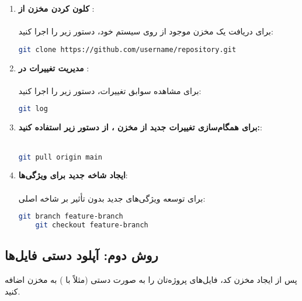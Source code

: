 \begin{enumerate}
    \item \textbf{کلون کردن مخزن از }:\\\\
    برای دریافت یک مخزن موجود از  روی سیستم خود، دستور زیر را اجرا کنید:
    \begin{terminal}
    \begin{lstlisting}[language=bash]
    git clone https://github.com/username/repository.git
    \end{lstlisting}
    \end{terminal} 

     \item \textbf{مدیریت تغییرات در }:\\\\
     برای مشاهده سوابق تغییرات، دستور زیر را اجرا کنید:
     \begin{terminal}
    \begin{lstlisting}[language=bash]
    git log
    \end{lstlisting}
    \end{terminal} 

    \item \textbf{برای همگام‌سازی تغییرات جدید از مخزن ، از دستور زیر استفاده کنید:}:\\\\
    \begin{terminal}
    \begin{lstlisting}[language=bash]
    git pull origin main
    \end{lstlisting}
    \end{terminal} 

    \item \textbf{ایجاد شاخه جدید برای ویژگی‌ها}:\\\\
    برای توسعه ویژگی‌های جدید بدون تأثیر بر شاخه اصلی:
    \begin{terminal}
    \begin{lstlisting}[language=bash]
    git branch feature-branch
    git checkout feature-branch
    \end{lstlisting}
    \end{terminal} 
    
    
\end{enumerate}


\subsection{روش دوم: آپلود دستی فایل‌ها}

پس از ایجاد مخزن کد، فایل‌های پروژه‌تان را به صورت دستی (مثلاً با ) به مخزن اضافه کنید.